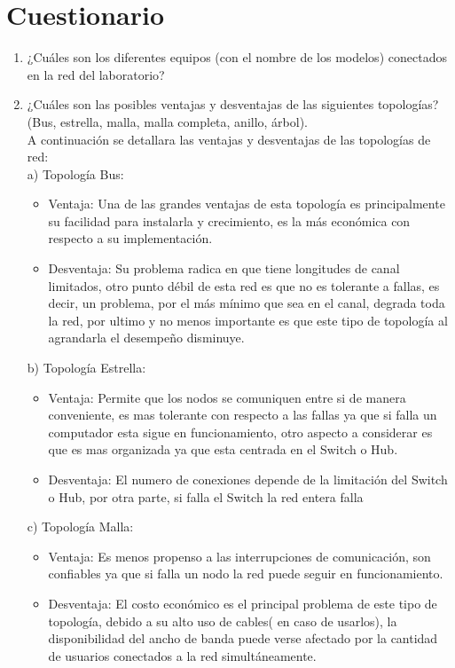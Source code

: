 \documentclass[spanish]{udpreport}
\begin{document}
\chapter{Cuestionario}
\begin{enumerate}
    \item ¿Cuáles son los diferentes equipos (con el nombre de los modelos) conectados en la red del laboratorio? 
    \item ¿Cuáles son las posibles ventajas y desventajas de las siguientes topologías? (Bus, estrella, malla, malla completa, anillo, árbol).
    \\ A continuación se detallara las ventajas y desventajas de las topologías de red:
    \\[0.1cm]
    a) Topología Bus:
    \begin{itemize}
        \item Ventaja: Una de las grandes ventajas de esta topología es principalmente su facilidad para instalarla y crecimiento, es la más económica con respecto a su implementación. 
        \item Desventaja: Su problema radica en que tiene longitudes de canal limitados, otro punto débil de esta red es que no es tolerante a fallas, es decir, un problema, por el más mínimo que sea en el canal, degrada toda la red, por ultimo y no menos importante es que este tipo de topología al agrandarla el desempeño disminuye.
    \end{itemize}
    b) Topología Estrella:
    \begin{itemize}
        \item Ventaja: Permite que los nodos se comuniquen entre si de manera conveniente, es mas tolerante con respecto a las fallas ya que si falla un computador esta sigue en funcionamiento, otro aspecto a considerar es que es mas organizada ya que esta centrada en el Switch o Hub.
        \item Desventaja: El numero de conexiones depende de la limitación del Switch o Hub, por otra parte, si falla el Switch la red entera falla  
    \end{itemize}
    c) Topología Malla:
    \begin{itemize}
        \item Ventaja: Es menos propenso a las interrupciones de comunicación, son confiables ya que si falla un nodo la red puede seguir en funcionamiento.
        \item Desventaja: El costo económico es el principal problema de este tipo de topología, debido a su alto uso de cables( en caso de usarlos), la disponibilidad del ancho de banda puede verse afectado por la cantidad de usuarios conectados a la red simultáneamente.

\end{itemize}
\end{enumerate}
\end{document}
